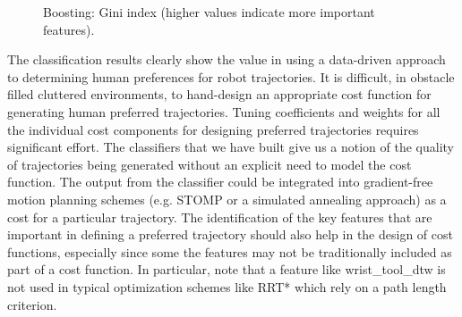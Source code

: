 \documentclass[letterpaper, 10 pt, conference]{ieeeconf}  %
\begin{document}
\begin{figure}[t]
  \caption{Boosting: Gini index (higher values indicate more important features).}
\label{fig:gini_boosting}
\vspace{-0.3in}
\end{figure}

The classification results clearly show the value in using a data-driven approach to determining human preferences for robot trajectories. It is difficult, 
in obstacle filled cluttered environments, to hand-design an appropriate cost function for generating human preferred trajectories. Tuning coefficients 
and weights for all the individual cost components for designing preferred trajectories requires significant effort. 
The classifiers that we have built give us a notion of the quality of trajectories 
being generated without an explicit need to model the cost function. The output from the classifier could be integrated into gradient-free motion planning schemes 
(e.g. STOMP or a simulated annealing approach) as a cost for a particular trajectory. The identification of the key features that are important in defining a preferred trajectory 
should also help in the design of cost functions, especially since some the features may not be traditionally included as part of a cost function. 
In particular, note that a feature like wrist\_tool\_dtw is not used in typical optimization schemes like RRT* which rely on a path length criterion. 
\end{document}

